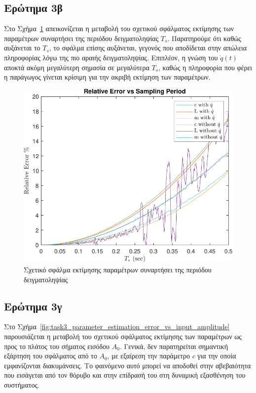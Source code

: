 \documentclass[a4paper,12pt]{article}
\begin{document}
\subsection*{Ερώτημα 3β}

Στο Σχήμα~\ref{fig:task3_parameter_estimation_error_vs_sampling_period} απεικονίζεται η μεταβολή του σχετικού σφάλματος εκτίμησης των παραμέτρων συναρτήσει της περιόδου δειγματοληψίας $T_s$. Παρατηρούμε ότι καθώς αυξάνεται το $T_s$, το σφάλμα επίσης αυξάνεται, γεγονός που αποδίδεται στην απώλεια πληροφορίας λόγω της πιο αραιής δειγματοληψίας. Επιπλέον, η γνώση του $\dot{q}(t)$ αποκτά ακόμη μεγαλύτερη σημασία σε μεγαλύτερα $T_s$, καθώς η πληροφορία που φέρει η παράγωγος γίνεται κρίσιμη για την ακριβή εκτίμηση των παραμέτρων.

\begin{figure}[h!]
    \centering
    \includegraphics[width=0.5\linewidth]{plot/task3_parameter_estimation_error_vs_sampling_period.pdf}
    \caption{Σχετικό σφάλμα εκτίμησης παραμέτρων συναρτήσει της περιόδου δειγματοληψίας}
    \label{fig:task3_parameter_estimation_error_vs_sampling_period}
\end{figure}

\subsection*{Ερώτημα 3γ}

Στο Σχήμα~\ref{fig:task3_parameter_estimation_error_vs_input_amplitude} παρουσιάζεται η μεταβολή του σχετικού σφάλματος εκτίμησης των παραμέτρων ως προς το πλάτος του σήματος εισόδου $A_0$. Γενικά, δεν παρατηρείται σημαντική εξάρτηση του σφάλματος από το $A_0$, με εξαίρεση την παράμετρο $c$ για την οποία εμφανίζονται διακυμάνσεις. Το φαινόμενο αυτό μπορεί να αποδοθεί στην αβεβαιότητα που εισάγεται από τον θόρυβο και στην επίδρασή του στη δυναμική εξασθένηση του συστήματος.
\end{document}
